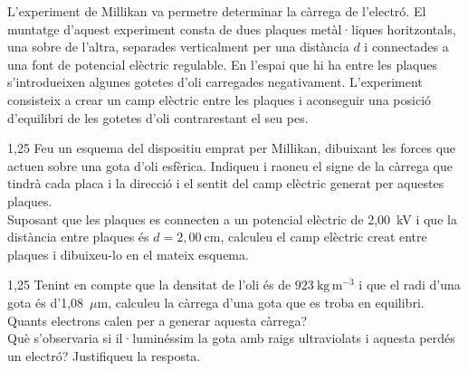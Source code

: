 L'experiment de Millikan va permetre determinar la càrrega de l'electró. El muntatge d'aquest experiment consta de dues plaques metàl·liques horitzontals, una sobre de l'altra, separades verticalment per una distància $d$ i connectades a una font de potencial elèctric regulable. En l'espai que hi ha entre les plaques s'introdueixen algunes gotetes d'oli carregades negativament. L'experiment consisteix a crear un camp elèctric entre les plaques i aconseguir una posició d'equilibri de les gotetes d'oli contrarestant el seu pes.

\begin{apartat}{1,25}
Feu un esquema del dispositiu emprat per Millikan, dibuixant les forces que actuen sobre una gota d'oli esfèrica. Indiqueu i raoneu el signe de la càrrega que tindrà cada placa i la direcció i el sentit del camp elèctric generat per aquestes plaques.\\
\hspace*{1em}Suposant que les plaques es connecten a un potencial elèctric de 2,00~kV i que la distància entre plaques és $d = 2,00\ \mathrm{cm}$, calculeu el camp elèctric creat entre plaques i dibuixeu-lo en el mateix esquema.
\end{apartat}

\begin{apartat}{1,25}
Tenint en compte que la densitat de l'oli és de $923\ \mathrm{kg\,m^{-3}}$ i que el radi d'una gota és d'1,08~$\mu$m, calculeu la càrrega d'una gota que es troba en equilibri. Quants electrons calen per a generar aquesta càrrega?\\
\hspace*{1em}Què s'observaria si il·luminéssim la gota amb raigs ultraviolats i aquesta perdés un electró? Justifiqueu la resposta.
\end{apartat}

